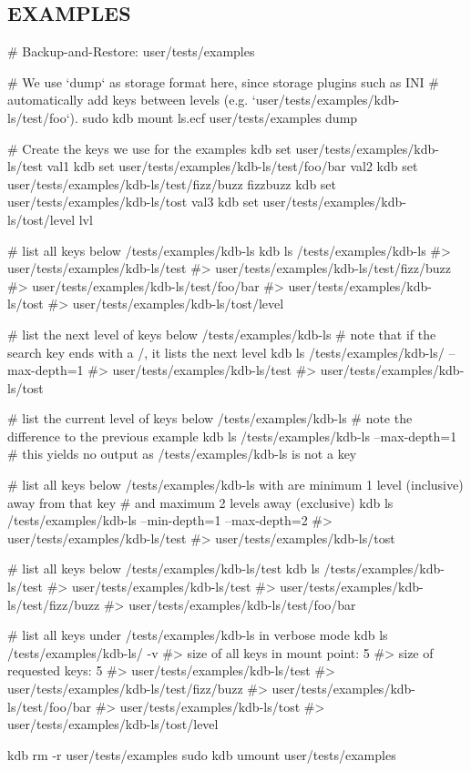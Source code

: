 \subsection*{E\+X\+A\+M\+P\+L\+ES}


\begin{DoxyCode}
# Backup-and-Restore: user/tests/examples

# We use `dump` as storage format here, since storage plugins such as INI
# automatically add keys between levels (e.g. `user/tests/examples/kdb-ls/test/foo`).
sudo kdb mount ls.ecf user/tests/examples dump

# Create the keys we use for the examples
kdb set user/tests/examples/kdb-ls/test val1
kdb set user/tests/examples/kdb-ls/test/foo/bar val2
kdb set user/tests/examples/kdb-ls/test/fizz/buzz fizzbuzz
kdb set user/tests/examples/kdb-ls/tost val3
kdb set user/tests/examples/kdb-ls/tost/level lvl

# list all keys below /tests/examples/kdb-ls
kdb ls /tests/examples/kdb-ls
#> user/tests/examples/kdb-ls/test
#> user/tests/examples/kdb-ls/test/fizz/buzz
#> user/tests/examples/kdb-ls/test/foo/bar
#> user/tests/examples/kdb-ls/tost
#> user/tests/examples/kdb-ls/tost/level

# list the next level of keys below /tests/examples/kdb-ls
# note that if the search key ends with a /, it lists the next level
kdb ls /tests/examples/kdb-ls/ --max-depth=1
#> user/tests/examples/kdb-ls/test
#> user/tests/examples/kdb-ls/tost

# list the current level of keys below /tests/examples/kdb-ls
# note the difference to the previous example
kdb ls /tests/examples/kdb-ls --max-depth=1
# this yields no output as /tests/examples/kdb-ls is not a key

# list all keys below /tests/examples/kdb-ls with are minimum 1 level (inclusive) away from that key
# and maximum 2 levels away (exclusive)
kdb ls /tests/examples/kdb-ls --min-depth=1 --max-depth=2
#> user/tests/examples/kdb-ls/test
#> user/tests/examples/kdb-ls/tost

# list all keys below /tests/examples/kdb-ls/test
kdb ls /tests/examples/kdb-ls/test
#> user/tests/examples/kdb-ls/test
#> user/tests/examples/kdb-ls/test/fizz/buzz
#> user/tests/examples/kdb-ls/test/foo/bar

# list all keys under /tests/examples/kdb-ls in verbose mode
kdb ls /tests/examples/kdb-ls/ -v
#> size of all keys in mount point: 5
#> size of requested keys: 5
#> user/tests/examples/kdb-ls/test
#> user/tests/examples/kdb-ls/test/fizz/buzz
#> user/tests/examples/kdb-ls/test/foo/bar
#> user/tests/examples/kdb-ls/tost
#> user/tests/examples/kdb-ls/tost/level

kdb rm -r user/tests/examples
sudo kdb umount user/tests/examples
\end{DoxyCode}


